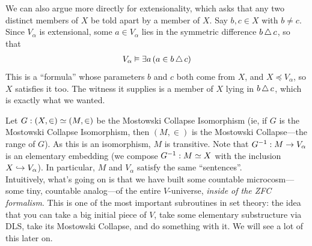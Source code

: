 \begin{boxexample}[ZFC]
\begin{description}
        We can also argue more directly for extensionality, which asks that any two distinct members of $X$ be told apart by a member of $X$. Say $b, c \in X$ with $b \ne c$. Since $V_{\alpha}$ is extensional, some $a \in V_{\alpha}$ lies in the symmetric difference $b \, \triangle \, c$, so that
        \begin{align*}
            V_{\alpha} \vDash \exists a \left( a \in b \, \triangle \, c \right)
        \end{align*}
        This is a ``formula'' whose parameters $b$ and $c$ both come from $X$, and $X \preceq V_{\alpha}$, so $X$ satisfies it too. The witness it supplies is a member of $X$ lying in $b \, \triangle \, c$, which is exactly what we wanted.
    \end{description}
    Let $G : \left( X, \in \right) \simeq \left( M, \in \right)$ be the Mostowski Collapse Isomorphism (ie, if $G$ is the Mostowski Collapse Isomorphism, then $(M, \in)$ is the Mostowski Collapse---the range of $G$). As this is an isomorphism, $M$ is transitive. Note that $G^{-1} : M \to V_{\alpha}$ is an elementary embedding (we compose $G^{-1} : M \simeq X$ with the inclusion $X \hookrightarrow V_{\alpha}$). In particular, $M$ and $V_{\alpha}$ satisfy the same ``sentences''. \\

    Intuitively, what's going on is that we have built some countable microcosm---some tiny, countable analog---of the entire $V$-universe, \textit{inside of the ZFC formalism}. This is one of the most important subroutines in set theory: the idea that you can take a big initial piece of $V$, take some elementary substructure via DLS, take its Mostowski Collapse, and do something with it. We will see a lot of this later on.

    \begin{figure}[H]
        \centering
    \end{figure}
\end{boxexample}

